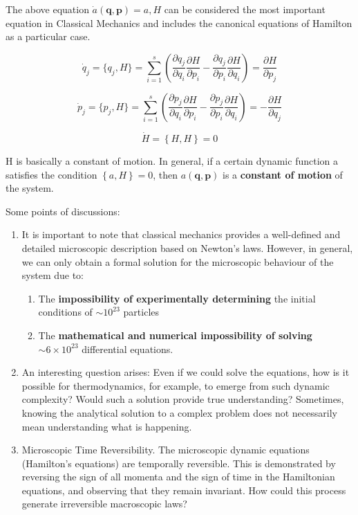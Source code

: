 \documentclass[12pt,a4paper]{report}
\newcommand{\esp}{\vspace{0.5cm}}
\begin{document}
	The above equation $\dot{a}(\mathbf{q}, \mathbf{p}) = {a, H}$ can be considered the most important equation in Classical Mechanics and includes the canonical equations of Hamilton as a particular case.
	
	\begin{equation}
		\dot{q}_j = \{q_j, H\} = \sum_{i=1}^{s} \left( \frac{\partial q_j}{\partial q_i} \frac{\partial H}{\partial p_i} - \frac{\partial q_j}{\partial p_i} \frac{\partial H}{\partial q_i} \right) = \frac{\partial H}{\partial p_j}
	\end{equation}
	
	\begin{equation}
		\dot{p}_j = \{p_j, H\} = \sum_{i=1}^{s} \left( \frac{\partial p_j}{\partial q_i} \frac{\partial H}{\partial p_i} - \frac{\partial p_j}{\partial p_i} \frac{\partial H}{\partial q_i} \right) = -\frac{\partial H}{\partial q_j}
	\end{equation}
	
	\begin{equation}
		\dot{H} = \left\{H, H\right\} = 0
	\end{equation}
	
	\esp
	
	H is basically a constant of motion. In general, if a certain dynamic function a satisfies the condition
	$\left\{a, H\right\} = 0$, then $a(\mathbf{q}, \mathbf{p})$ is a \textbf{constant of motion} of the system.
	
	\esp
	
	Some points of discussions:
	
	\begin{enumerate}
		\item  It is important to note that classical mechanics provides a well-defined and detailed microscopic description based on Newton’s laws. However, in general, we can only obtain a formal solution for the microscopic behaviour of the system due to:
		\begin{enumerate}
			\item The \textbf{impossibility of experimentally determining} the initial conditions of $\sim 10^{23}$ particles
			\item The \textbf{mathematical and numerical impossibility of solving} $\sim6\times10^{23}$ differential equations.
		\end{enumerate}
		\item An interesting question arises: Even if we could solve the equations, how is it possible for thermodynamics, for example, to emerge from such dynamic complexity? Would such a solution provide true
		understanding? Sometimes, knowing the analytical solution to a complex problem does not necessarily
		mean understanding what is happening.
		\item Microscopic Time Reversibility. The microscopic dynamic equations (Hamilton’s equations) are temporally reversible. This is demonstrated by reversing the sign of all momenta and the sign of time in the Hamiltonian equations, and observing that they remain invariant. How could this process generate
		irreversible macroscopic laws?
	\end{enumerate}
	
\end{document}

